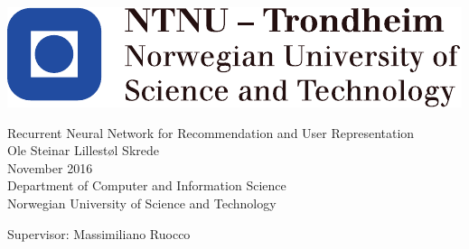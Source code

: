 
\thispagestyle{empty}
\includegraphics[scale=1.1]{fig/logos/NTNU}
\mbox{}\\[6pc]
\begin{center}
\Huge{Recurrent Neural Network for Recommendation and User Representation}\\[2pc]

\Large{Ole Steinar Lillestøl Skrede}\\[1pc]
\large{November 2016}\\[2pc]

Department of Computer and Information Science\\
Norwegian University of Science and Technology
\end{center}
\vfill

\noindent Supervisor: Massimiliano Ruocco

